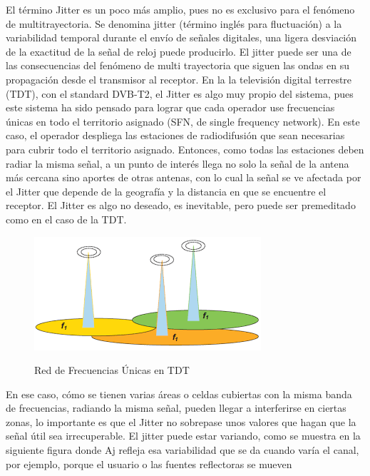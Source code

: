 El término Jitter es un poco más amplio, pues no es exclusivo para el fenómeno de multitrayectoria. Se denomina jitter (término inglés para fluctuación) a la variabilidad temporal durante el envío de señales digitales, una ligera desviación de la exactitud de la señal de reloj puede producirlo. El jitter puede ser una de las consecuencias del fenómeno de multi trayectoria que siguen las ondas en su propagación desde el transmisor al receptor. En la la televisión digital terrestre (TDT), con el standard DVB-T2, el Jitter es algo muy propio del sistema, pues este sistema ha sido pensado para lograr que cada operador use frecuencias únicas en todo el territorio asignado (SFN, de single frequency network). En este caso, el operador despliega las estaciones de radiodifusión que sean necesarias para cubrir todo el territorio asignado. Entonces, como todas las estaciones deben radiar la misma señal, a un punto de interés llega no solo la señal de la antena más cercana sino aportes de otras antenas, con lo cual la señal se ve afectada por el Jitter que depende de la geografía y la distancia en que se encuentre el receptor. El Jitter es algo no deseado, es inevitable, pero puede ser premeditado como en el caso de la TDT. \\

\begin{figure}[h!]
	\captionsetup{justification = raggedright, singlelinecheck = false}
	\caption{Red de Frecuencias Únicas en TDT} 
	\centering
	\includegraphics[scale=1]{Imagenes/Jitter.png}
	\label{fig:Jitter}
\end{figure}

En ese caso, cómo se tienen varias áreas o celdas cubiertas con la misma banda de frecuencias, radiando la misma señal, pueden llegar a interferirse en ciertas zonas, lo importante es que el Jitter no sobrepase unos valores que hagan que la señal útil sea irrecuperable. El jitter puede estar variando, como se muestra en la siguiente figura donde Aj refleja esa variabilidad que se da cuando varía el canal, por ejemplo, porque el usuario o las fuentes reflectoras se mueven \\

